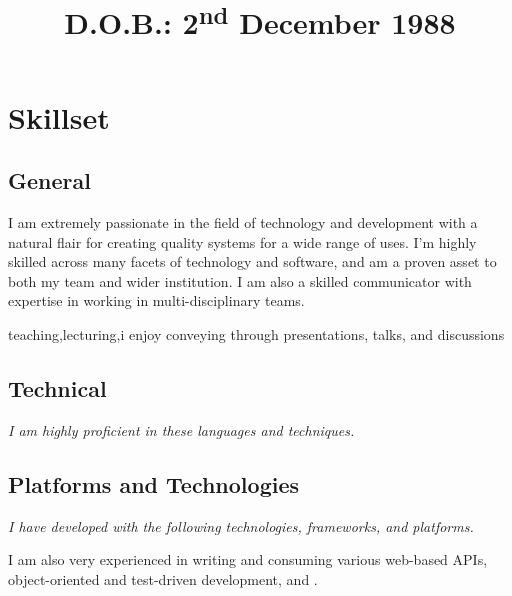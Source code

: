 \documentclass[11pt,a4paper,sans]{moderncv} %
\title{\small{D.O.B.: 2\textsuperscript{nd} December 1988}}
\begin{document}
\makecvtitle

\vspace{-1cm}

\section{Skillset}
	\subsection{General}
    \hspace{2.5cm}\parbox[b][3em][t]{0.8\textwidth}{I am extremely passionate in the field of technology and development with a natural flair for creating quality systems for a wide range of uses. I'm highly skilled across many facets of technology and software, and am a proven asset to both my team and wider institution. I am also a skilled communicator with expertise in working in multi-disciplinary teams.}
    teaching,lecturing,i enjoy conveying through presentations, talks, and discussions

	\subsection{Technical}
		\hspace{2.5cm}\textit{I am highly proficient in these languages and techniques.}\\

	\subsection{Platforms and Technologies}
		\hspace{2.5cm}\textit{I have developed with the following technologies, frameworks, and platforms.}\\

        \hspace{2.5cm}I am also very experienced in writing and consuming various web-based APIs, object-oriented and test-driven development, and .
\end{document}
